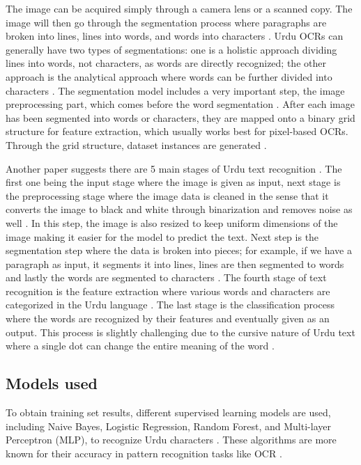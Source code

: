 \documentclass[11pt,twocolumn,twoside]{article} %
\begin{document}
    The image can be acquired simply through a camera lens or a scanned copy. The image will then go through the segmentation process where paragraphs are broken into lines, lines into words, and words into characters \cite{rizvi2018ocr}. Urdu OCRs can generally have two types of segmentations: one is a holistic approach dividing lines into words, not characters, as words are directly recognized; the other approach is the analytical approach where words can be further divided into characters \cite{rizvi2018ocr}. The segmentation model includes a very important step, the image preprocessing part, which comes before the word segmentation \cite{rizvi2018ocr}. After each image has been segmented into words or characters, they are mapped onto a binary grid structure for feature extraction, which usually works best for pixel-based OCRs. Through the grid structure, dataset instances are generated \cite{rizvi2018ocr}.

    Another paper suggests there are 5 main stages of Urdu text recognition \cite{alrobah2022arabic}. The first one being the input stage where the image is given as input, next stage is the preprocessing stage where the image data is cleaned in the sense that it converts the image to black and white through binarization and removes noise as well \cite{alrobah2022arabic}. In this step, the image is also resized to keep uniform dimensions of the image making it easier for the model to predict the text. Next step is the segmentation step where the data is broken into pieces; for example, if we have a paragraph as input, it segments it into lines, lines are then segmented to words and lastly the words are segmented to characters \cite{alrobah2022arabic}. The fourth stage of text recognition is the feature extraction where various words and characters are categorized in the Urdu language \cite{alrobah2022arabic}. The last stage is the classification process where the words are recognized by their features and eventually given as an output. This process is slightly challenging due to the cursive nature of Urdu text where a single dot can change the entire meaning of the word \cite{alrobah2022arabic}.


\subsection{Models used}
To obtain training set results, different supervised learning models are used, including Naive Bayes, Logistic Regression, Random Forest, and Multi-layer Perceptron (MLP), to recognize Urdu characters \cite{rizvi2018ocr}. These algorithms are more known for their accuracy in pattern recognition tasks like OCR \cite{rizvi2018ocr}.
\end{document}
